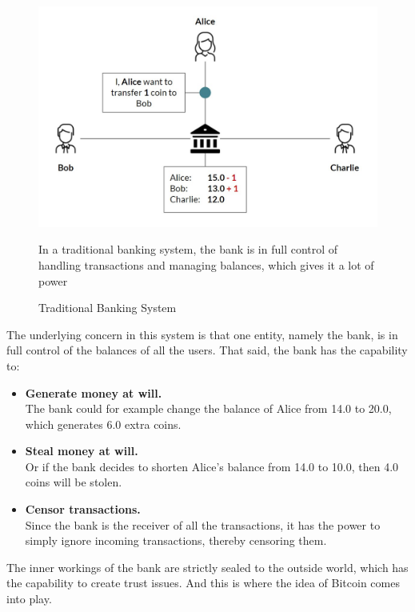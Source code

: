 \documentclass[a4paper, 12pt]{report}
\begin{document}
\begin{figure}[H]
	\includegraphics[width=\textwidth]{01_Banking_System}
	\caption{Traditional Banking System}
	\medskip
	\small In a traditional banking system, the bank is in full control of handling transactions and managing balances, which gives it a lot of power
	\label{fig:01_Banking_System}
\end{figure}

\par The underlying concern in this system is that one entity, namely the bank, is in full control of the balances of all the users. That said, the bank has the capability to:

\begin{itemize}
	\item \textbf{Generate money at will.}\\The bank could for example change the balance of Alice from 14.0 to 20.0, which generates 6.0 extra coins.
	\item \textbf{Steal money at will.}\\Or if the bank decides to shorten Alice’s balance from 14.0 to 10.0, then 4.0 coins will be stolen.
	\item \textbf{Censor transactions.}\\Since the bank is the receiver of all the transactions, it has the power to simply ignore incoming transactions, thereby censoring them.
\end{itemize}

\par The inner workings of the bank are strictly sealed to the outside world, which has the capability to create trust issues. And this is where the idea of Bitcoin comes into play.
\end{document}
